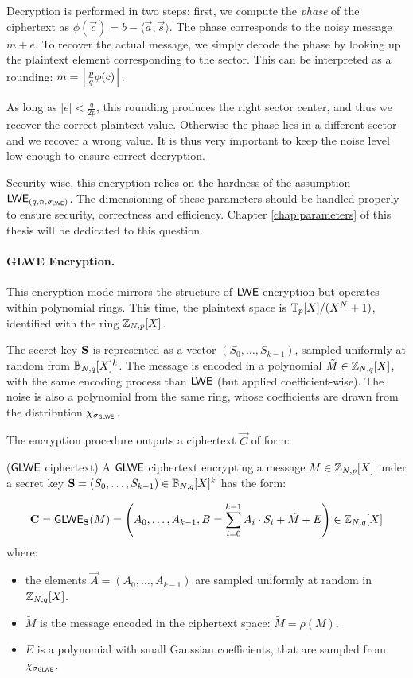 Decryption is performed in two steps: first, we compute the \emph{phase} of the ciphertext as $\phi(\vec c) = b - \langle \vec a, \vec s\rangle$. The phase corresponds to the noisy message $\tilde{m} + e$. To recover the actual message, we simply decode the phase by looking up the plaintext element corresponding to the sector. This can be interpreted as a rounding: $m = \left \lfloor \frac p q \phi(c) \right \rceil$. 

As long as $|e| < \frac{q}{2p}$, this rounding produces the right sector center, and thus we recover the correct plaintext value. Otherwise the phase lies in a different sector and we recover a wrong value. It is thus very important to keep the noise level low enough to ensure correct decryption.


Security-wise, this encryption relies on the hardness of the assumption $\textsf{LWE}_{(q, n, \sigma_{\textsf{LWE}})}$. The dimensioning of these parameters should be handled properly to ensure security, correctness and efficiency. Chapter \ref{chap:parameters} of this thesis will be dedicated to this question.



\paragraph{GLWE Encryption.} This encryption mode mirrors the structure of $\textsf{LWE}$ encryption but operates within polynomial rings.
This time, the plaintext space is $\mathbb{T}_p[X] / (X^N + 1)$, identified with the ring $\mathbb{Z}_{N,p}[X]$.

The secret key $\mathbf S$ is represented as a vector $(S_0, \dots, S_{k-1})$, sampled uniformly at random from $\mathbb{B}_{N, q}[X]^k$. 
%
The message is encoded in a polynomial $\tilde M \in \mathbb{Z}_{N,q}[X]$, with the same encoding process than $\textsf{LWE}$ (but applied coefficient-wise). The noise is also a polynomial from the same ring, whose coefficients are drawn from the distribution $\chi_{\sigma_{\textsf{GLWE}}}$.
%

The encryption procedure outputs a ciphertext $\vec C$ of form:


\begin{definition}($\textsf{GLWE}$ ciphertext)
	A $\textsf{GLWE}$ ciphertext encrypting a message $M \in \mathbb{Z}_{N,p}[X]$ under a secret key $\mathbf S = (S_0, \dots, S_{k-1}) \in \mathbb{B}_{N, q}[X]^k$ has the form:
	
	\begin{equation*}
		\mathbf C = \textsf{GLWE}_{\mathbf S}(M) = \left ( A_0, \dots, A_{k-1}, B = \sum_{i=0}^{k-1} A_i \cdot S_i + \tilde M + E \right ) \in \mathbb{Z}_{N,q}[X]
	\end{equation*}
	where:
	\begin{itemize}
		\item the elements $\vec A = (A_0, \dots, A_{k-1})$ are sampled uniformly at random in $\mathbb{Z}_{N,q}[X]$.
		\item $\tilde M$ is the message encoded in the ciphertext space: $\tilde M = \rho(M)$.
		\item $E$ is a polynomial with small Gaussian coefficients, that are sampled from $\chi_{\sigma_{\textsf{GLWE}}}$.
	\end{itemize}
\end{definition}



